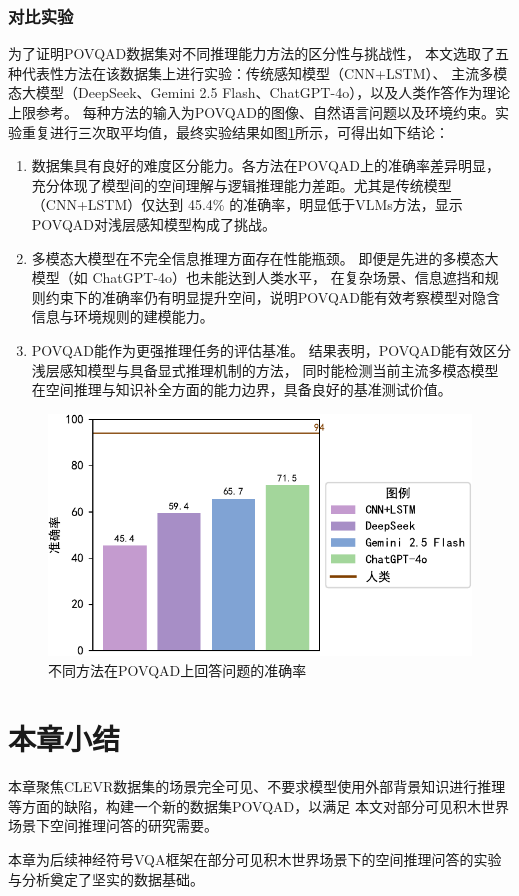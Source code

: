\subsubsection{对比实验}
为了证明POVQAD数据集对不同推理能力方法的区分性与挑战性，
本文选取了五种代表性方法在该数据集上进行实验：传统感知模型（CNN+LSTM）、
主流多模态大模型（DeepSeek、Gemini 2.5 Flash、ChatGPT-4o），以及人类作答作为理论上限参考。
每种方法的输入为POVQAD的图像、自然语言问题以及环境约束。实验重复进行三次取平均值，最终实验结果如图\ref{fig:dataset-comparison}所示，可得出如下结论：
\begin{enumerate}[nosep]
\item 数据集具有良好的难度区分能力。各方法在POVQAD上的准确率差异明显，充分体现了模型间的空间理解与逻辑推理能力差距。尤其是传统模型（CNN+LSTM）仅达到 45.4\% 的准确率，明显低于VLMs方法，显示POVQAD对浅层感知模型构成了挑战。
\item 多模态大模型在不完全信息推理方面存在性能瓶颈。
即便是先进的多模态大模型（如 ChatGPT-4o）也未能达到人类水平，
在复杂场景、信息遮挡和规则约束下的准确率仍有明显提升空间，说明POVQAD能有效考察模型对隐含信息与环境规则的建模能力。
\item POVQAD能作为更强推理任务的评估基准。
结果表明，POVQAD能有效区分浅层感知模型与具备显式推理机制的方法，
同时能检测当前主流多模态模型在空间推理与知识补全方面的能力边界，具备良好的基准测试价值。
\end{enumerate}
\begin{figure}[h]
\centering
\includegraphics[scale=0.8]{figures/dataset-experiment-crop.pdf}
\caption{不同方法在POVQAD上回答问题的准确率}
\label{fig:dataset-comparison}
\end{figure}
\section{本章小结}
本章聚焦CLEVR数据集的场景完全可见、不要求模型使用外部背景知识进行推理等方面的缺陷，构建一个新的数据集POVQAD，以满足
本文对部分可见积木世界场景下空间推理问答的研究需要。

本章为后续神经符号VQA框架在部分可见积木世界场景下的空间推理问答的实验与分析奠定了坚实的数据基础。